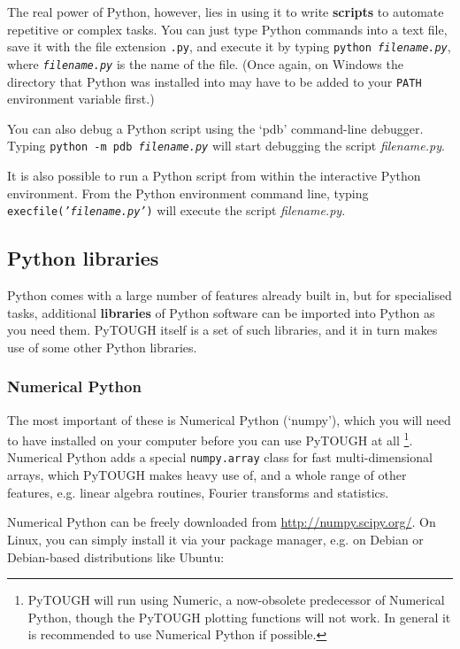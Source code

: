 The real power of Python, however, lies in using it to write \textbf{scripts} to automate repetitive or complex tasks.  You can just type Python commands into a text file, save it with the file extension \texttt{.py}, and execute it by typing \texttt{python \emph{filename.py}}, where \texttt{\emph{filename.py}} is the name of the file.  (Once again, on Windows the directory that Python was installed into may have to be added to your \texttt{PATH} environment variable first.)

You can also debug a Python script using the `pdb' command-line debugger.  Typing \texttt{python -m pdb \emph{filename.py}} will start debugging the script \emph{filename.py}.

It is also possible to run a Python script from within the interactive Python environment.  From the Python environment command line, typing \texttt{execfile(\emph{'filename.py'})} will execute the script \emph{filename.py}.

\subsection{Python libraries}
\label{pylibraries}

Python comes with a large number of features already built in, but for specialised tasks, additional \textbf{libraries} of Python software can be imported into Python as you need them.  PyTOUGH itself is a set of such libraries, and it in turn makes use of some other Python libraries.

\subsubsection{Numerical Python}

The most important of these is Numerical Python (`numpy'), which you will need to have installed on your computer before you can use PyTOUGH at all \footnote{PyTOUGH will run using Numeric, a now-obsolete predecessor of Numerical Python, though the PyTOUGH plotting functions will not work.  In general it is recommended to use Numerical Python if possible.}.  Numerical Python adds a special \texttt{numpy.array} class for fast multi-dimensional arrays, which PyTOUGH makes heavy use of, and a whole range of other features, e.g. linear algebra routines, Fourier transforms and statistics.

Numerical Python can be freely downloaded from \url{http://numpy.scipy.org/}.  On Linux, you can simply install it via your package manager, e.g. on Debian or Debian-based distributions like Ubuntu:

